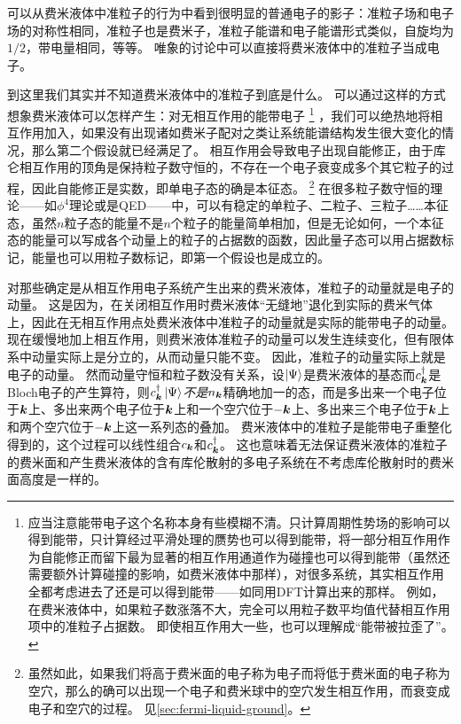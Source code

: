 可以从费米液体中准粒子的行为中看到很明显的普通电子的影子：准粒子场和电子场的对称性相同，准粒子也是费米子，准粒子能谱和电子能谱形式类似，自旋均为$1/2$，带电量相同，等等。
唯象的讨论中可以直接将费米液体中的准粒子当成电子。

到这里我们其实并不知道费米液体中的准粒子到底是什么。
可以通过这样的方式想象费米液体可以怎样产生：对无相互作用的能带电子%
\footnote{
    应当注意能带电子这个名称本身有些模糊不清。只计算周期性势场的影响可以得到能带，只计算经过平滑处理的赝势也可以得到能带，将一部分相互作用作为自能修正而留下最为显著的相互作用通道作为碰撞也可以得到能带（虽然还需要额外计算碰撞的影响，如费米液体中那样），对很多系统，其实相互作用全都考虑进去了还是可以得到能带——如同用DFT计算出来的那样。
    例如，在费米液体中，如果粒子数涨落不大，完全可以用粒子数平均值代替相互作用项中的准粒子占据数。
    即使相互作用大一些，也可以理解成“能带被拉歪了”。
}%
，我们可以绝热地将相互作用加入，如果没有出现诸如费米子配对之类让系统能谱结构发生很大变化的情况，那么第二个假设就已经满足了。
相互作用会导致电子出现自能修正，由于库仑相互作用的顶角是保持粒子数守恒的，不存在一个电子衰变成多个其它粒子的过程，因此自能修正是实数，即单电子态的确是本征态。%
\footnote{
    虽然如此，如果我们将高于费米面的电子称为电子而将低于费米面的电子称为空穴，那么的确可以出现一个电子和费米球中的空穴发生相互作用，而衰变成电子和空穴的过程。
    见\autoref{sec:fermi-liquid-ground}。
}%
在很多粒子数守恒的理论——如$\phi^4$理论或是QED——中，可以有稳定的单粒子、二粒子、三粒子……本征态，虽然$n$粒子态的能量不是$n$个粒子的能量简单相加，但是无论如何，一个本征态的能量可以写成各个动量上的粒子的占据数的函数，因此量子态可以用占据数标记，能量也可以用粒子数标记，即第一个假设也是成立的。

对那些确定是从相互作用电子系统产生出来的费米液体，准粒子的动量就是电子的动量。
这是因为，在关闭相互作用时费米液体“无缝地”退化到实际的费米气体上，因此在无相互作用点处费米液体中准粒子的动量就是实际的能带电子的动量。
现在缓慢地加上相互作用，则费米液体准粒子的动量可以发生连续变化，但有限体系中动量实际上是分立的，从而动量只能不变。
因此，准粒子的动量实际上就是电子的动量。
然而动量守恒和粒子数没有关系，设$\ket{\Psi}$是费米液体的基态而$c^\dagger_{\vb*{k}}$是Bloch电子的产生算符，则$c^\dagger_{\vb*{k}} \ket{\Psi}$\emph{不是}$n_{\vb*{k}}$精确地加一的态，而是多出来一个电子位于$\vb*{k}$上、多出来两个电子位于$\vb*{k}$上和一个空穴位于$-\vb*{k}$上、多出来三个电子位于$\vb*{k}$上和两个空穴位于$-\vb*{k}$上这一系列态的叠加。
费米液体中的准粒子是能带电子重整化得到的，这个过程可以线性组合$c_{\vb*{k}}$和$c^\dagger_{\vb*{k}}$。
这也意味着无法保证费米液体的准粒子的费米面和产生费米液体的含有库伦散射的多电子系统在不考虑库伦散射时的费米面高度是一样的。

